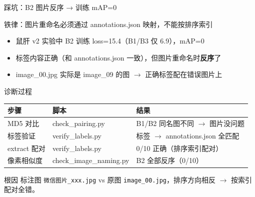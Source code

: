 \documentclass[aspectratio=169, 10pt]{beamer}
\begin{document}
\begin{frame}{踩坑：B2 图片反序 → 训练 mAP=0}
  \begin{alertblock}{铁律：图片重命名必须通过 annotations.json 映射，不能按排序索引}
    \begin{itemize}
      \item 鼠肝 v2 实验中 B2 训练 loss=15.4（B1/B3 仅 6.9），mAP=0
      \item 标签内容正确（和 annotations.json 一致），但图片重命名时\textbf{反序}了
      \item image\_00.jpg 实际是 image\_09 的图 $\to$ 正确标签配在错误图片上
    \end{itemize}
  \end{alertblock}
  \vspace{0em}
  \begin{block}{诊断过程}
    \begin{tabular}{p{2.5cm}p{3.5cm}p{5cm}}
      \toprule
      \textbf{步骤} & \textbf{脚本} & \textbf{结果} \\
      \midrule
      MD5 对比 & check\_pairing.py & B1/B2 同名图不同 $\to$ 图片没问题 \\
      标签验证 & verify\_labels.py & 标签 $\to$ annotations.json 全匹配 \\
      extract 配对 & verify\_labels.py & 0/10 正确（排序索引配对）\\
      \alert{像素相似度} & check\_image\_naming.py & \alert{B2 全部反序}（0/10）\\
      \bottomrule
    \end{tabular}
  \end{block}
  \vspace{0em}
  \begin{alertblock}{根因}
    标注图 \texttt{微信图片\_xxx.jpg} vs 原图 \texttt{image\_00.jpg}，排序方向相反 $\to$ 按索引配对全错。
  \end{alertblock}
\end{frame}
\end{document}
